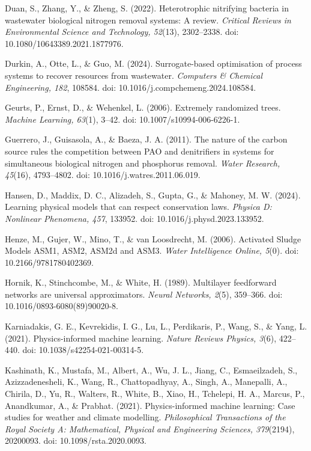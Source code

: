 \documentclass[a4paper,fleqn]{cas-sc}
\begin{document}
\noindent Duan, S., Zhang, Y., \& Zheng, S. (2022). Heterotrophic nitrifying bacteria in wastewater biological nitrogen removal systems: A review. \textit{Critical Reviews in Environmental Science and Technology, 52}(13), 2302--2338. doi: 10.1080/10643389.2021.1877976.

\noindent Durkin, A., Otte, L., \& Guo, M. (2024). Surrogate-based optimisation of process systems to recover resources from wastewater. \textit{Computers \& Chemical Engineering, 182}, 108584. doi: 10.1016/j.compchemeng.2024.108584.

\noindent Geurts, P., Ernst, D., \& Wehenkel, L. (2006). Extremely randomized trees. \textit{Machine Learning, 63}(1), 3--42. doi: 10.1007/s10994-006-6226-1.

\noindent Guerrero, J., Guisasola, A., \& Baeza, J. A. (2011). The nature of the carbon source rules the competition between PAO and denitrifiers in systems for simultaneous biological nitrogen and phosphorus removal. \textit{Water Research, 45}(16), 4793--4802. doi: 10.1016/j.watres.2011.06.019.

\noindent Hansen, D., Maddix, D. C., Alizadeh, S., Gupta, G., \& Mahoney, M. W. (2024). Learning physical models that can respect conservation laws. \textit{Physica D: Nonlinear Phenomena, 457}, 133952. doi: 10.1016/j.physd.2023.133952.

\noindent Henze, M., Gujer, W., Mino, T., \& van Loosdrecht, M. (2006). Activated Sludge Models ASM1, ASM2, ASM2d and ASM3. \textit{Water Intelligence Online, 5}(0). doi: 10.2166/9781780402369.

\noindent Hornik, K., Stinchcombe, M., \& White, H. (1989). Multilayer feedforward networks are universal approximators. \textit{Neural Networks, 2}(5), 359--366. doi: 10.1016/0893-6080(89)90020-8.

\noindent Karniadakis, G. E., Kevrekidis, I. G., Lu, L., Perdikaris, P., Wang, S., \& Yang, L. (2021). Physics-informed machine learning. \textit{Nature Reviews Physics, 3}(6), 422--440. doi: 10.1038/s42254-021-00314-5.

\noindent Kashinath, K., Mustafa, M., Albert, A., Wu, J. L., Jiang, C., Esmaeilzadeh, S., Azizzadenesheli, K., Wang, R., Chattopadhyay, A., Singh, A., Manepalli, A., Chirila, D., Yu, R., Walters, R., White, B., Xiao, H., Tchelepi, H. A., Marcus, P., Anandkumar, A., \& Prabhat. (2021). Physics-informed machine learning: Case studies for weather and climate modelling. \textit{Philosophical Transactions of the Royal Society A: Mathematical, Physical and Engineering Sciences, 379}(2194), 20200093. doi: 10.1098/rsta.2020.0093.
\end{document}
